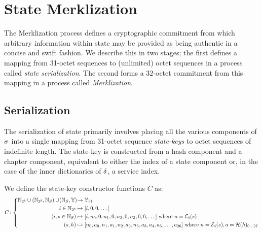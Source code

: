\section{State Merklization}\label{sec:statemerklization}

The Merklization process defines a cryptographic commitment from which arbitrary information within state may be provided as being authentic in a concise and swift fashion. We describe this in two stages; the first defines a mapping from 31-octet sequences to (unlimited) octet sequences in a process called \emph{state serialization}. The second forms a 32-octet commitment from this mapping in a process called \emph{Merklization}.

\subsection{Serialization}

The serialization of state primarily involves placing all the various components of $\sigma$ into a single mapping from 31-octet sequence \emph{state-keys} to octet sequences of indefinite length. The state-key is constructed from a hash component and a chapter component, equivalent to either the index of a state component or, in the case of the inner dictionaries of $\delta$, a service index.

We define the state-key constructor functions $C$ as:
\begin{equation}
  C\colon\abracegroup{
    \Nbits{8} \cup (\Nbits{8}, \serviceid) \cup \tup{\serviceid, \blob} &\to \bloboflen{31} \\
    i \in \Nbits{8} &\mapsto [i, 0, 0, \dots] \\
    (i, s \in \serviceid) &\mapsto [i, n_0, 0, n_1, 0, n_2, 0, n_3, 0, 0, \dots]\ \where n = \fixedencode{4}{s} \\
    (s, h) &\mapsto [n_0, a_0, n_1, a_1, n_2, a_2, n_3, a_3, a_4, a_5, \dots, a_{26}]\ \where n = \fixedencode{4}{s}, a = \blake(h)\interval{0}{27}
  }
\end{equation}

